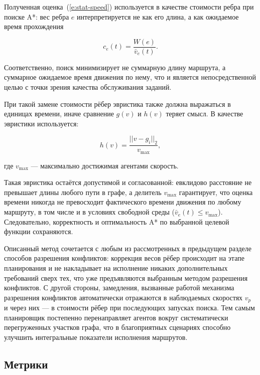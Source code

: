 Полученная оценка~(\ref{e:stat-speed}) используется в качестве стоимости ребра при поиске A*: 
вес ребра $e$ интерпретируется не как его длина, а как ожидаемое время прохождения

\begin{equation}
    c_e(t) = \frac{W(e)}{\bar{v}_e(t)}.
\label{e:stat-cost}
\end{equation}

Соответственно, поиск минимизирует не суммарную длину маршрута, а суммарное ожидаемое время движения 
по нему, что и является непосредственной целью с точки зрения качества обслуживания заданий.

При такой замене стоимости рёбер эвристика также должна выражаться в единицах времени, иначе 
сравнение $g(v)$ и $h(v)$ теряет смысл. В качестве эвристики используется:

\begin{equation}
    h(v) = \frac{||v - g_i||_2}{v_{\max}},
\label{e:stat-heuristic}
\end{equation}

где $v_{\max}$ --- максимально достижимая агентами скорость.

Такая эвристика остаётся допустимой и согласованной: евклидово расстояние не превышает длины любого 
пути в графе, а делитель $v_{\max}$ гарантирует, что оценка времени никогда не превосходит 
фактического времени движения по любому маршруту, в том числе и в условиях свободной среды 
($\bar{v}_e(t) \leq v_{\max}$). Следовательно, корректность и оптимальность A* по выбранной целевой 
функции сохраняются.

Описанный метод сочетается с любым из рассмотренных в предыдущем разделе способов разрешения 
конфликтов: коррекция весов рёбер происходит на этапе планирования и не накладывает на исполнение 
никаких дополнительных требований сверх тех, что уже предъявляются выбранным методом разрешения 
конфликтов. С другой стороны, замедления, вызванные работой механизма разрешения конфликтов 
автоматически отражаются в наблюдаемых скоростях $v_p$ и через них --- в стоимости рёбер при 
последующих запусках поиска. Тем самым планировщик постепенно перенаправляет агентов вокруг 
систематически перегруженных участков графа, что в благоприятных сценариях способно улучшить 
интегральные показатели исполнения маршрутов.

\subsection{Метрики}

